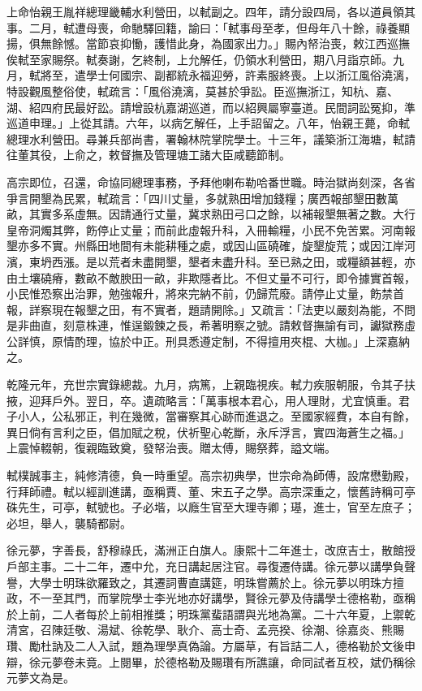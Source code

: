 \begin{pinyinscope}
上命怡親王胤祥總理畿輔水利營田，以軾副之。四年，請分設四局，各以道員領其事。二月，軾遭母喪，命馳驛回籍，諭曰：「軾事母至孝，但母年八十餘，祿養顯揚，俱無餘憾。當節哀抑慟，護惜此身，為國家出力。」賜內帑治喪，敕江西巡撫俟軾至家賜祭。軾奏謝，乞終制，上允解任，仍領水利營田，期八月詣京師。九月，軾將至，遣學士何國宗、副都統永福迎勞，許素服終喪。上以浙江風俗澆漓，特設觀風整俗使，軾疏言：「風俗澆漓，莫甚於爭訟。臣巡撫浙江，知杭、嘉、湖、紹四府民最好訟。請增設杭嘉湖巡道，而以紹興屬寧臺道。民間詞訟冤抑，準巡道申理。」上從其請。六年，以病乞解任，上手詔留之。八年，怡親王薨，命軾總理水利營田。尋兼兵部尚書，署翰林院掌院學士。十三年，議築浙江海塘，軾請往董其役，上俞之，敕督撫及管理塘工諸大臣咸聽節制。

高宗即位，召還，命協同總理事務，予拜他喇布勒哈番世職。時治獄尚刻深，各省爭言開墾為民累，軾疏言：「四川丈量，多就熟田增加錢糧；廣西報部墾田數萬畝，其實多系虛無。因請通行丈量，冀求熟田弓口之餘，以補報墾無著之數。大行皇帝洞燭其弊，飭停止丈量；而前此虛報升科，入冊輸糧，小民不免苦累。河南報墾亦多不實。州縣田地間有未能耕種之處，或因山區磽確，旋墾旋荒；或因江岸河濱，東坍西漲。是以荒者未盡開墾，墾者未盡升科。至已熟之田，或糧額甚輕，亦由土壤磽瘠，數畝不敵腴田一畝，非欺隱者比。不但丈量不可行，即令據實首報，小民惟恐察出治罪，勉強報升，將來完納不前，仍歸荒廢。請停止丈量，飭禁首報，詳察現在報墾之田，有不實者，題請開除。」又疏言：「法吏以嚴刻為能，不問是非曲直，刻意株連，惟逞鍛鍊之長，希著明察之號。請敕督撫諭有司，讞獄務虛公詳慎，原情酌理，協於中正。刑具悉遵定制，不得擅用夾棍、大枷。」上深嘉納之。

乾隆元年，充世宗實錄總裁。九月，病篤，上親臨視疾。軾力疾服朝服，令其子扶掖，迎拜戶外。翌日，卒。遺疏略言：「萬事根本君心，用人理財，尤宜慎重。君子小人，公私邪正，判在幾微，當審察其心跡而進退之。至國家經費，本自有餘，異日倘有言利之臣，倡加賦之稅，伏祈聖心乾斷，永斥浮言，實四海蒼生之福。」上震悼輟朝，復親臨致奠，發帑治喪。贈太傅，賜祭葬，謚文端。

軾樸誠事主，純修清德，負一時重望。高宗初典學，世宗命為師傅，設席懋勤殿，行拜師禮。軾以經訓進講，亟稱賈、董、宋五子之學。高宗深重之，懷舊詩稱可亭硃先生，可亭，軾號也。子必堦，以廕生官至大理寺卿；璂，進士，官至左庶子；必坦，舉人，襲騎都尉。

徐元夢，字善長，舒穆祿氏，滿洲正白旗人。康熙十二年進士，改庶吉士，散館授戶部主事。二十二年，遷中允，充日講起居注官。尋復遷侍講。徐元夢以講學負聲譽，大學士明珠欲羅致之，其遷詞曹直講筵，明珠嘗薦於上。徐元夢以明珠方擅政，不一至其門，而掌院學士李光地亦好講學，賢徐元夢及侍講學士德格勒，亟稱於上前，二人者每於上前相推獎；明珠黨蜚語謂與光地為黨。二十六年夏，上禦乾清宮，召陳廷敬、湯斌、徐乾學、耿介、高士奇、孟亮揆、徐潮、徐嘉炎、熊賜瓚、勵杜訥及二人入試，題為理學真偽論。方屬草，有旨詰二人，德格勒於文後申辯，徐元夢卷未竟。上閱畢，於德格勒及賜瓚有所譙讓，命同試者互校，斌仍稱徐元夢文為是。


\end{pinyinscope}
